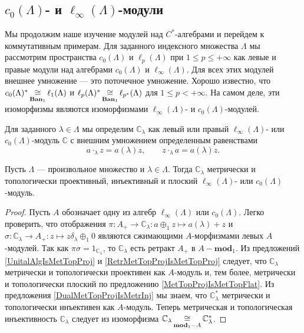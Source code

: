 
\subsection{\texorpdfstring{$c_0(\Lambda)$}{c0(Lambda)}- и \texorpdfstring{$\ell_\infty(\Lambda)$}{lInfty(Lambda)}-модули}
\label{SubSectionc0AndlInftyModules}

Мы продолжим наше изучение модулей над $C^*$-алгебрами и перейдем к коммутативным примерам. Для заданного индексного множества $\Lambda$ мы рассмотрим пространства $c_0(\Lambda)$ и $\ell_p(\Lambda)$ при $1\leq p\leq+\infty$ как левые и правые модули над алгебрами $c_0(\Lambda)$ и $\ell_\infty(\Lambda)$. Для всех этих модулей внешнее умножение --- это поточечное умножение. Хорошо известно, что $c_0(\Lambda)^*\mathop{\mathbin{\cong}}\limits_{\mathbf{Ban}_1}\ell_1(\Lambda)$ и $\ell_p(\Lambda)^*\mathop{\mathbin{\cong}}\limits_{\mathbf{Ban}_1}\ell_{p^*}(\Lambda)$ для $1\leq p<+\infty$. На самом деле, эти изоморфизмы являются изоморфизмами $\ell_\infty(\Lambda)$- и $c_0(\Lambda)$-модулей. 

Для заданного $\lambda\in\Lambda$ мы определим $\mathbb{C}_\lambda$ как левый или правый $\ell_\infty(\Lambda)$- или $c_0(\Lambda)$-модуль $\mathbb{C}$ с внешним умножением определенным равенствами
$$
a\cdot_\lambda z=a(\lambda)z,\qquad z\cdot_\lambda a=a(\lambda) z.
$$

\begin{proposition}\label{OneDimlInftyc0ModMetTopProjIngFlat} Пусть $\Lambda$ --- произвольное множество и $\lambda\in\Lambda$. Тогда $\mathbb{C}_\lambda$ метрически и топологически проективный, инъективный и плоский $\ell_\infty(\Lambda)$- или $c_0(\Lambda)$-модуль.
\end{proposition}
\begin{proof} Пусть $A$ обозначает одну из алгебр $\ell_\infty(\Lambda)$ или $c_0(\Lambda)$. Легко проверить, что отображения $\pi:A_+\to\mathbb{C}_\lambda:a\oplus_1 z\mapsto a(\lambda)+z$ и $\sigma:\mathbb{C}_\lambda\to A_+:z\mapsto z\delta_\lambda\oplus_1 0$ являются сжимающими $A$-морфизмами левых $A$-модулей. Так как $\pi\sigma=1_{\mathbb{C}_\lambda}$, то $\mathbb{C}_\lambda$ есть ретракт $A_+$ в $A-\mathbf{mod}_1$. Из предложений \ref{UnitalAlgIsMetTopProj} и \ref{RetrMetTopProjIsMetTopProj} следует, что $\mathbb{C}_\lambda$ метрически и топологически проективен как $A$-модуль и, тем более, метрически и топологически плоский по предложению \ref{MetTopProjIsMetTopFlat}. Из предложения \ref{DualMetTopProjIsMetrInj} мы знаем, что $\mathbb{C}_\lambda^*$ метрически и топологически инъективен как $A$-модуль. Теперь метрическая и топологическая инъективность $\mathbb{C}_\lambda$ следует из изоморфизма $\mathbb{C}_\lambda\mathop{\mathbin{\cong}}\limits_{\mathbf{mod}_1-A}\mathbb{C}_\lambda^*$.
\end{proof}

